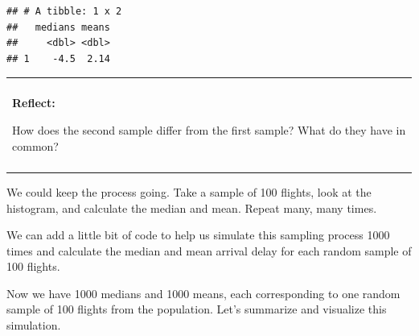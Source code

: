 \documentclass[]{book}
\newenvironment{Shaded}{\begin{snugshade}}{\end{snugshade}}
\newcommand{\CommentTok}[1]{\textcolor[rgb]{0.56,0.35,0.01}{\textit{#1}}}
\newcommand{\DataTypeTok}[1]{\textcolor[rgb]{0.13,0.29,0.53}{#1}}
\newcommand{\DecValTok}[1]{\textcolor[rgb]{0.00,0.00,0.81}{#1}}
\newcommand{\KeywordTok}[1]{\textcolor[rgb]{0.13,0.29,0.53}{\textbf{#1}}}
\newcommand{\NormalTok}[1]{#1}
\newcommand{\OperatorTok}[1]{\textcolor[rgb]{0.81,0.36,0.00}{\textbf{#1}}}
\newcommand{\StringTok}[1]{\textcolor[rgb]{0.31,0.60,0.02}{#1}}
\newenvironment{reflect}
{
    \begin{center}
    
    \begin{tabular}{|p{0.8\textwidth}|}
    \rowcolor{LightBlue}
    \hline\\
    \rowcolor{LightBlue}
    \textbf{Reflect:}
}
{
    \\\rowcolor{LightBlue}
    \\\hline
    \end{tabular} 
    \end{center}
}
\begin{document}
\begin{verbatim}
## # A tibble: 1 x 2
##   medians means
##     <dbl> <dbl>
## 1    -4.5  2.14
\end{verbatim}

\begin{reflect}
How does the second sample differ from the first sample? What do they
have in common?
\end{reflect}

We could keep the process going. Take a sample of 100 flights, look at the histogram, and calculate the median and mean. Repeat many, many times.

We can add a little bit of code to help us simulate this sampling process 1000 times and calculate the median and mean arrival delay for each random sample of 100 flights.

\begin{Shaded}
\end{Shaded}

Now we have 1000 medians and 1000 means, each corresponding to one random sample of 100 flights from the population. Let's summarize and visualize this simulation.
\end{document}
